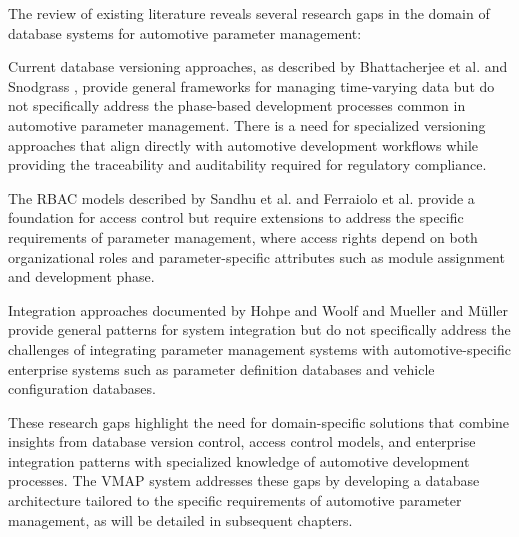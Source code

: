 The review of existing literature reveals several research gaps in the domain of database systems for automotive parameter management:

Current database versioning approaches, as described by Bhattacherjee et al. \cite{bhattacherjee2015principles} and Snodgrass \cite{snodgrass1999developing}, provide general frameworks for managing time-varying data but do not specifically address the phase-based development processes common in automotive parameter management. There is a need for specialized versioning approaches that align directly with automotive development workflows while providing the traceability and auditability required for regulatory compliance.

The RBAC models described by Sandhu et al. \cite{sandhu1998role} and Ferraiolo et al. \cite{ferraiolo2011policy} provide a foundation for access control but require extensions to address the specific requirements of parameter management, where access rights depend on both organizational roles and parameter-specific attributes such as module assignment and development phase.

Integration approaches documented by Hohpe and Woolf \cite{hohpe2002enterprise} and Mueller and Müller \cite{mueller2018conception} provide general patterns for system integration but do not specifically address the challenges of integrating parameter management systems with automotive-specific enterprise systems such as parameter definition databases and vehicle configuration databases.

These research gaps highlight the need for domain-specific solutions that combine insights from database version control, access control models, and enterprise integration patterns with specialized knowledge of automotive development processes. The VMAP system addresses these gaps by developing a database architecture tailored to the specific requirements of automotive parameter management, as will be detailed in subsequent chapters.